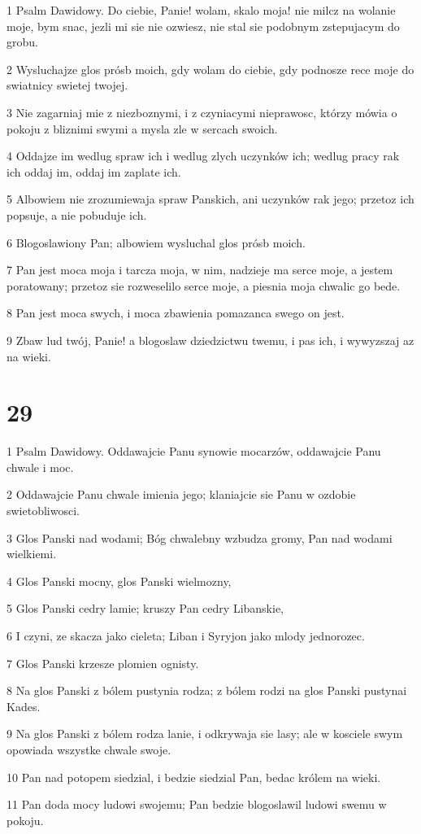 \par 1 Psalm Dawidowy. Do ciebie, Panie! wolam, skalo moja! nie milcz na wolanie moje, bym snac, jezli mi sie nie ozwiesz, nie stal sie podobnym zstepujacym do grobu.
\par 2 Wysluchajze glos prósb moich, gdy wolam do ciebie, gdy podnosze rece moje do swiatnicy swietej twojej.
\par 3 Nie zagarniaj mie z niezboznymi, i z czyniacymi nieprawosc, którzy mówia o pokoju z bliznimi swymi a mysla zle w sercach swoich.
\par 4 Oddajze im wedlug spraw ich i wedlug zlych uczynków ich; wedlug pracy rak ich oddaj im, oddaj im zaplate ich.
\par 5 Albowiem nie zrozumiewaja spraw Panskich, ani uczynków rak jego; przetoz ich popsuje, a nie pobuduje ich.
\par 6 Blogoslawiony Pan; albowiem wysluchal glos prósb moich.
\par 7 Pan jest moca moja i tarcza moja, w nim, nadzieje ma serce moje, a jestem poratowany; przetoz sie rozweselilo serce moje, a piesnia moja chwalic go bede.
\par 8 Pan jest moca swych, i moca zbawienia pomazanca swego on jest.
\par 9 Zbaw lud twój, Panie! a blogoslaw dziedzictwu twemu, i pas ich, i wywyzszaj az na wieki.

\chapter{29}

\par 1 Psalm Dawidowy. Oddawajcie Panu synowie mocarzów, oddawajcie Panu chwale i moc.
\par 2 Oddawajcie Panu chwale imienia jego; klaniajcie sie Panu w ozdobie swietobliwosci.
\par 3 Glos Panski nad wodami; Bóg chwalebny wzbudza gromy, Pan nad wodami wielkiemi.
\par 4 Glos Panski mocny, glos Panski wielmozny,
\par 5 Glos Panski cedry lamie; kruszy Pan cedry Libanskie,
\par 6 I czyni, ze skacza jako cieleta; Liban i Syryjon jako mlody jednorozec.
\par 7 Glos Panski krzesze plomien ognisty.
\par 8 Na glos Panski z bólem pustynia rodza; z bólem rodzi na glos Panski pustynai Kades.
\par 9 Na glos Panski z bólem rodza lanie, i odkrywaja sie lasy; ale w kosciele swym opowiada wszystke chwale swoje.
\par 10 Pan nad potopem siedzial, i bedzie siedzial Pan, bedac królem na wieki.
\par 11 Pan doda mocy ludowi swojemu; Pan bedzie blogoslawil ludowi swemu w pokoju.

